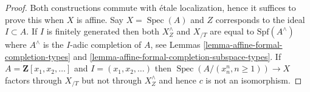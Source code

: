 \documentclass{stacks-project}
\theoremstyle{plain}
\theoremstyle{definition}
\theoremstyle{remark}
\numberwithin{equation}{subsection}
\def\Spec{\mathop{\mathrm{Spec}}}
\begin{document}
\begin{proof}
Both constructions commute with \'etale localization, hence it suffices
to prove this when $X$ is affine. Say $X = \Spec(A)$ and $Z$ corresponds
to the ideal $I \subset A$. If $I$ is finitely generated then both
$X^\wedge_Z$ and $X_{/T}$ are equal to $\text{Spf}(A^\wedge)$ where $A^\wedge$
is the $I$-adic completion of $A$, see
Lemmas \ref{lemma-affine-formal-completion-types} and
\ref{lemma-affine-formal-completion-subspace-types}.
If $A = \mathbf{Z}[x_1, x_2, \ldots]$ and $I = (x_1, x_2, \ldots)$
then $\Spec(A/(x_n^n, n \geq 1)) \to X$ factors through $X_{/T}$
but not through $X^\wedge_Z$ and hence $c$ is not an isomorphism.
\end{proof}
\end{document}
